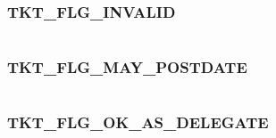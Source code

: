\documentclass[letterpaper,10pt,english]{sphinxmanual}
\begin{document}
\subsubsection{TKT\_FLG\_INVALID}
\label{appdev/refs/macros/TKT_FLG_INVALID:tkt-flg-invalid-data}\label{appdev/refs/macros/TKT_FLG_INVALID::doc}\label{appdev/refs/macros/TKT_FLG_INVALID:tkt-flg-invalid}

\begin{fulllineitems}
\label{appdev/refs/macros/TKT_FLG_INVALID:TKT_FLG_INVALID}
\end{fulllineitems}


\begin{tabulary}{\linewidth}{|L|L|}
\hline

 & 
\\
\hline\end{tabulary}



\subsubsection{TKT\_FLG\_MAY\_POSTDATE}
\label{appdev/refs/macros/TKT_FLG_MAY_POSTDATE:tkt-flg-may-postdate}\label{appdev/refs/macros/TKT_FLG_MAY_POSTDATE::doc}\label{appdev/refs/macros/TKT_FLG_MAY_POSTDATE:tkt-flg-may-postdate-data}

\begin{fulllineitems}
\label{appdev/refs/macros/TKT_FLG_MAY_POSTDATE:TKT_FLG_MAY_POSTDATE}
\end{fulllineitems}


\begin{tabulary}{\linewidth}{|L|L|}
\hline

 & 
\\
\hline\end{tabulary}



\subsubsection{TKT\_FLG\_OK\_AS\_DELEGATE}
\label{appdev/refs/macros/TKT_FLG_OK_AS_DELEGATE:tkt-flg-ok-as-delegate-data}\label{appdev/refs/macros/TKT_FLG_OK_AS_DELEGATE:tkt-flg-ok-as-delegate}\label{appdev/refs/macros/TKT_FLG_OK_AS_DELEGATE::doc}
\end{document}
